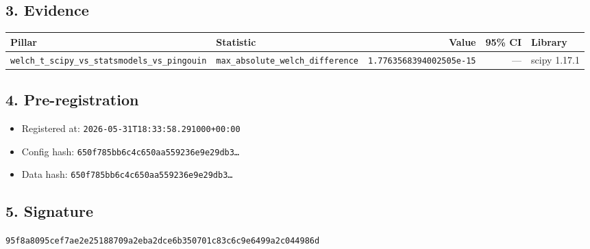 \documentclass{article}
\begin{document}
\subsection*{3. Evidence}
\begin{tabular}{llrrl}\toprule
\textbf{Pillar} & \textbf{Statistic} & \textbf{Value} & \textbf{95\% CI} & \textbf{Library} \\\midrule
\texttt{welch\_t\_scipy\_vs\_statsmodels\_vs\_pingouin} & \texttt{max\_absolute\_welch\_difference} & \texttt{1.7763568394002505e-15} & --- & scipy 1.17.1 \\
\bottomrule\end{tabular}
\subsection*{4. Pre-registration}
\begin{itemize}
\item Registered at: \texttt{2026-05-31T18:33:58.291000+00:00}
\item Config hash: \texttt{650f785bb6c4c650aa559236e9e29db3\dots}
\item Data hash: \texttt{650f785bb6c4c650aa559236e9e29db3\dots}
\end{itemize}
\subsection*{5. Signature}
\texttt{95f8a8095cef7ae2e25188709a2eba2dce6b350701c83c6c9e6499a2c044986d}\\
\end{document}
